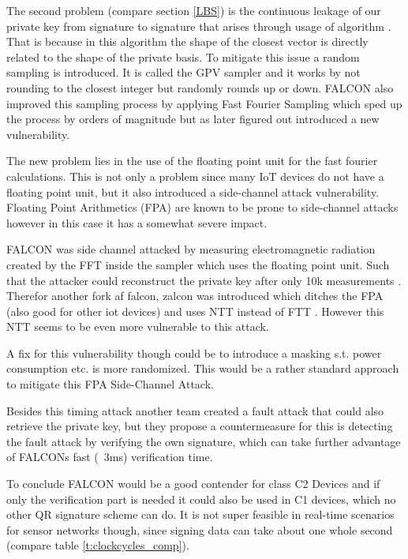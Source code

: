 \documentclass[conference]{IEEEtran}
\begin{document}
The second problem (compare section \ref{LBS}) is the continuous leakage of our private key from signature to signature that arises through usage of algorithm \label{alg:babel}. That is because in this algorithm the shape of the closest vector is directly related to the shape of the private basis.
To mitigate this issue a random sampling is introduced. It is called the GPV sampler \cite{falcon_easyier_read} and it works by not rounding to the closest integer but randomly rounds up or down.
FALCON also improved this sampling process by applying Fast Fourier Sampling which sped up the process by orders of magnitude but as later figured out introduced a new vulnerability. 

The new problem lies in the use of the floating point unit for the fast fourier calculations. This is not only a problem since many IoT devices do not have a floating point unit, but it also introduced a side-channel attack vulnerability.
Floating Point Arithmetics (FPA) are known to be prone to side-channel attacks however in this case it has a somewhat severe impact.

FALCON was side channel attacked by measuring electromagnetic radiation created by the FFT inside the sampler which uses the floating point unit. Such that the attacker could reconstruct the private key after only 10k measurements \cite{falcon_side_channel}. Therefor another fork af falcon, zalcon was introduced which ditches the FPA (also good for other iot devices) and uses NTT instead of FTT \cite{zalcon}. However this NTT seems to be even more vulnerable to this attack. \cite{falcon_side_channel} 

A fix for this vulnerability though could be to introduce a masking s.t. power consumption etc. is more randomized. This would be a rather standard approach to mitigate this FPA Side-Channel Attack.

Besides this timing attack another team \cite{bearz} created a fault attack that could also retrieve the private key, but they propose a countermeasure for this is detecting the fault attack by verifying the own signature, which can take further advantage of FALCONs fast (~3ms) verification time.

To conclude FALCON would be a good contender for class C2 Devices and if only the verification part is needed it could also be used in C1 devices, which no other QR signature scheme can do. 
It is not super feasible in real-time scenarios for sensor networks though, since signing data can take about one whole second (compare table \ref{t:clockcycles_comp}).
\end{document}

